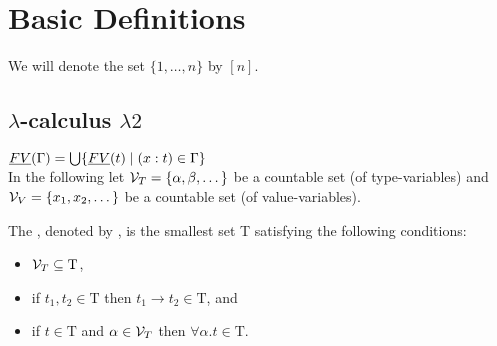 \section{Basic Definitions}
We will denote the set $\{1,\dots,n\}$ by $\left[n\right]$.
\subsection{$\lambda$-calculus $\lambda2$}
$\emph{FV}(\Gamma)=\bigcup\{\emph{FV}(t)\mid (x:t)\in \Gamma\}$\\
In the following let $\mathcal{V}_T=\{\alpha,\beta,\dots\}$ be a countable set (of type-variables) and $\mathcal{V}_V=\{x_1,x_2,\dots\}$ be a countable set (of value-variables).
\begin{definition}
	The , denoted by \lambdaTypes{}, is the smallest set T satisfying the following conditions:
	\begin{itemize}
		\item $\mathcal{V}_T\subseteq\text{T}$,
		\item if $t_1,t_2\in\text{T}$ then $t_1\to t_2\in\text{T}$, and
		\item if $t\in\text{T}$ and $\alpha\in\mathcal{V}_T$ then $\forall\alpha.t\in\text{T}$.
	\end{itemize}
\end{definition}

